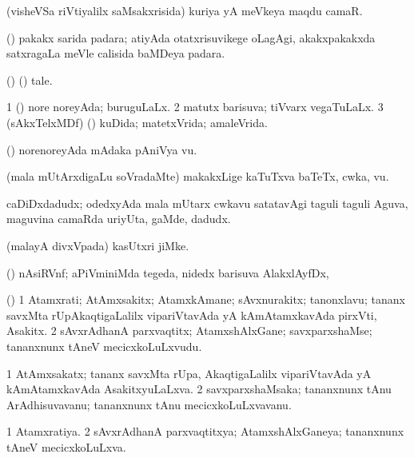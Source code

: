 \bentry
{}
\gl{\nA}
\bmng
(visheVSa riVtiyalilx saMsakxrisida) kuriya yA meVkeya maqdu camaR. 
\emng
\eentry

\bentry
{}
\gl{\nA}
\bmng
(\BUvi) pakakx sarida padara; atiyAda otatxrisuvikege oLagAgi, akakxpakakxda satxragaLa meVle calisida baMDeya padara. 
\emng
\eentry

\bentry
{}
\gl{\nA}
\bmng
(\birx) (\ashi) tale. 
\emng
\eentry

\bentry
{}
\gl{\gu}
\bmng
\bnum
\num{1} (\pArxparx) nore noreyAda; buruguLaLx. 
\num{2} matutx barisuva; tiVvarx vegaTuLaLx. 
\num{3} (sAkxTelxMDf) (\ashi) kuDida; matetxVrida; amaleVrida. 
\enum
\emng
\eentry

\bentry
{}
\gl{\nA}
\bmng
(\pArxparx) norenoreyAda mAdaka pAniVya \mo vu. 
\emng
\eentry

\bentry
{}
\gl{\nA}
\bmng
(mala mUtArxdigaLu soVradaMte) makakxLige kaTuTxva baTeTx, cwka, \mo vu. 
\emng
\eentry

\bentry
{}
\gl{\nA}
\bmng
caDiDxdadudx; odedxyAda mala mUtarx cwkavu satatavAgi taguli taguli Aguva, maguvina camaRda uriyUta, gaMde, dadudx. 
\emng
\eentry

\bentry
{}
\gl{\nA}
\bmng
(malayA divxVpada) kasUtxri jiMke. 
\emng
\eentry

\bentry
{}
\gl{\nA}
\bmng
(\ravi) nAsiRVnf; aPiVminiMda tegeda, nidedx barisuva AlakxlAyfDx,  
\emng
\eentry

\bentry
{}
\gl{\nA}
\bmng
(\mashA) 
\bnum
\num{1} Atamxrati; AtAmxsakitx; AtamxkAmane; sAvxnurakitx; tanonxlavu; tananx savxMta rUpAkaqtigaLalilx vipariVtavAda yA kAmAtamxkavAda pirxVti, Asakitx. 
\num{2} sAvxrAdhanA parxvaqtitx; AtamxshAlxGane; savxparxshaMse; tananxnunx tAneV mecicxkoLuLxvudu. 
\enum
\emng
\eentry

\bentry
{}
\gl{\nA}
\bmng
\bnum
\num{1} AtAmxsakatx; tananx savxMta rUpa, AkaqtigaLalilx vipariVtavAda yA kAmAtamxkavAda AsakitxyuLaLxva. 
\num{2} savxparxshaMsaka; tananxnunx tAnu ArAdhisuvavanu; tananxnunx tAnu mecicxkoLuLxvavanu. 
\enum
\emng
\eentry

\bentry
{}
\gl{\gu}
\bmng
\bnum
\num{1} Atamxratiya. 
\num{2} sAvxrAdhanA parxvaqtitxya; AtamxshAlxGaneya; tananxnunx tAneV mecicxkoLuLxva. 
\enum
\emng
\eentry


